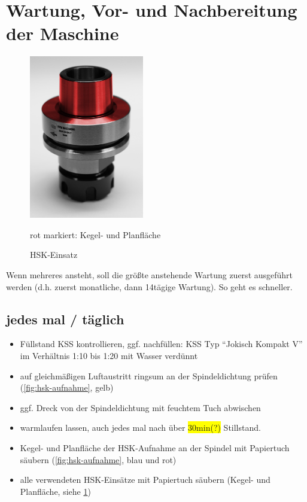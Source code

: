 \documentclass{\basedir/fablab-document}
\renewcommand{\todo}[1]{\colorbox{yellow}{{#1}}}
\begin{document}
\section{Wartung, Vor- und Nachbereitung der Maschine}
\begin{figure}
\centering
\includegraphics[width=5cm]{./img/hsk-einsatz.jpg}
\caption{HSK-Einsatz}
rot markiert: Kegel- und Planfläche
\label{fig:hsk-einsatz}
\end{figure}


Wenn mehreres ansteht, soll die größte anstehende Wartung zuerst ausgeführt werden (d.h. zuerst monatliche, dann 14tägige Wartung). So geht es schneller.

\subsection{jedes mal / täglich}
\begin{itemize}
	\item Füllstand KSS kontrollieren, ggf. nachfüllen: KSS Typ \enquote{Jokisch Kompakt V} im Verhältnis 1:10 bis 1:20 mit Wasser verdünnt
	\item auf gleichmäßigen Luftaustritt ringsum an der Spindeldichtung prüfen (\cref{fig:hsk-aufnahme}, gelb)
	\item ggf. Dreck von der Spindeldichtung mit feuchtem Tuch abwischen
	\item warmlaufen lassen, auch jedes mal nach über \todo{30min(?)} Stillstand. %
	\item Kegel- und Planfläche der HSK-Aufnahme an der Spindel mit Papiertuch säubern (\cref{fig:hsk-aufnahme}, blau und rot)
	\item alle verwendeten HSK-Einsätze mit Papiertuch säubern (Kegel- und Planfläche, siehe \cref{fig:hsk-einsatz})
\end{itemize}
\end{document}
